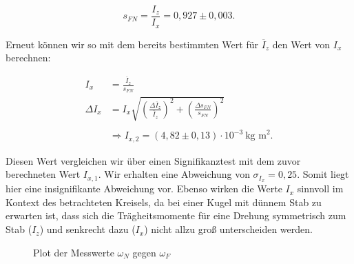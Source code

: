 \documentclass{article}
\begin{document}
\begin{equation}
    s_{FN} = \frac{I_z}{I_x} = 0,927 \pm 0,003 .
\end{equation}

Erneut können wir so mit dem bereits bestimmten Wert für $\overline{I}_z$ den Wert von $I_x$ berechnen:

\begin{equation}
    \begin{split}
        I_x &= \frac{\overline{I}_z}{s_{FN}} \\
        \Delta I_x &= I_x \sqrt{\left( \frac{\Delta \overline{I}_z}{\overline{I}_z} \right)^2 + \left( \frac{\Delta s_{FN}}{s_{FN}} \right)^2} \\ \\
        &\Rightarrow I_{x,2} = (4,82 \pm 0,13) \cdot 10^{-3} \ \text{kg m}^2.
    \end{split}
\end{equation}

Diesen Wert vergleichen wir über einen Signifikanztest mit dem zuvor berechneten Wert $I_{x,1}$. Wir erhalten eine Abweichung von $\sigma_{I_x} = 0,25$. Somit liegt hier eine insignifikante Abweichung vor. Ebenso wirken die Werte $I_x$ sinnvoll im Kontext des betrachteten Kreisels, da bei einer Kugel mit dünnem Stab zu erwarten ist, dass sich die Trägheitsmomente für eine Drehung symmetrisch zum Stab ($I_z$) und senkrecht dazu ($I_x$) nicht allzu groß unterscheiden werden.

\begin{figure}[!hp]
    \centering
    \caption{Plot der Messwerte $\omega_N$ gegen $\omega_F$}
    \label{plt:Omega_NvsOmega_F}
\end{figure}
\end{document}
